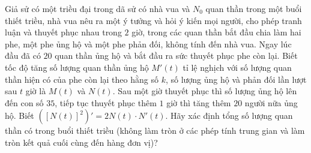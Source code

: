 \begin{ex}%
	Giả sử có một triều đại trong dã sử có nhà vua và $N_0$ quan thần trong một buổi thiết triều, nhà vua nêu ra một ý tưởng và hỏi ý kiến mọi người, cho phép tranh luận và thuyết phục nhau trong $2$ giờ, trong các quan thần bắt đầu chia làm hai phe, một phe ủng hộ và một phe phản đối, không tính đến nhà vua. Ngay lúc đầu đã có $20$ quan thần ủng hộ và bắt đầu ra sức thuyết phục phe còn lại. Biết tốc độ tăng số lượng quan thần ủng hộ $M'(t)$ tỉ lệ nghịch với số lượng quan thần hiện có của phe còn lại theo hằng số $k$, số lượng ủng hộ và phản đối lần lượt sau $t$ giờ là $M(t)$ và $N(t)$. Sau một giờ thuyết phục thì số lượng ủng hộ lên đến con số $35$, tiếp tục thuyết phục thêm $1$ giờ thì tăng thêm $20$ người nữa ủng hộ. Biết $\left([N(t)]^2\right)'=2N(t)\cdot N'(t)$. Hãy xác định tổng số lượng quan thần có trong buổi thiết triều (không làm tròn ở các phép tính trung gian và làm tròn kết quả cuối cùng đến hàng đơn vị)?
	\par
\end{ex}
